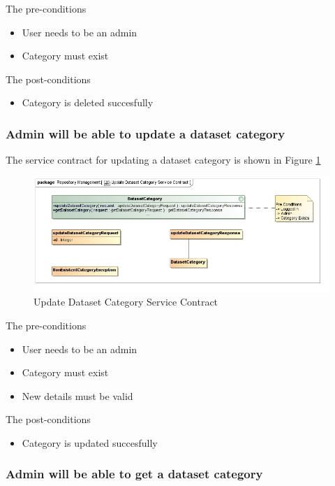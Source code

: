 The pre-conditions
\begin{itemize}
  \item User needs to be an admin
  \item Category must exist
\end{itemize}

The post-conditions
\begin{itemize}
  \item Category is deleted succesfully
\end{itemize}

\subsubsection {Admin will be able to update a dataset category}

The service contract for updating a dataset category is shown in Figure \ref{fig:updateDatasetCatService}
\begin{figure}[H]
  \begin{center}
  \includegraphics[scale=0.6]{../Diagrams and Charts/Test Data/Update Dataset Category Service Contract.jpg}
  \caption{Update Dataset Category Service Contract}
  \end{center}
  \label{fig:updateDatasetCatService}
\end{figure}


The pre-conditions
\begin{itemize}
  \item User needs to be an admin
  \item Category must exist
  \item New details must be valid
\end{itemize}

The post-conditions
\begin{itemize}
  \item Category is updated succesfully
\end{itemize}
\subsubsection {Admin will be able to get a dataset category}

